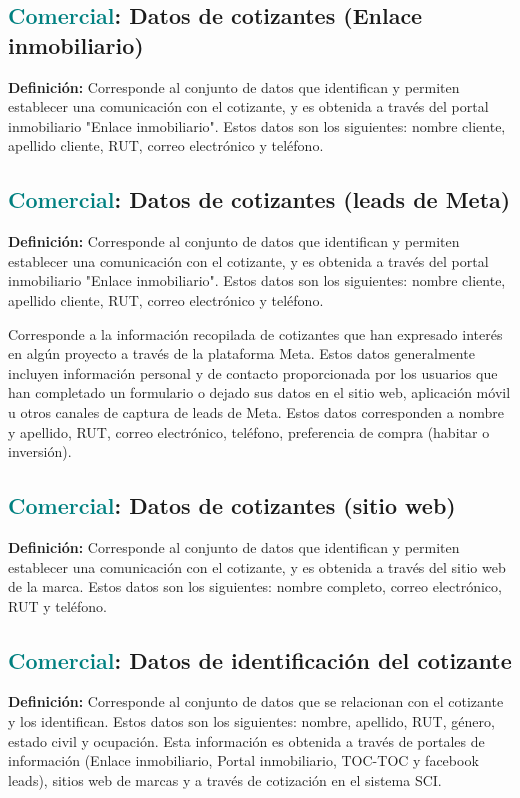 \documentclass[12pt]{article}
\begin{document}
\subsection{\textcolor{teal}{Comercial}: Datos de cotizantes (Enlace inmobiliario)}
\textbf{Definición:} Corresponde al conjunto de datos que identifican y permiten establecer una comunicación con el cotizante, y es obtenida a través del portal inmobiliario "Enlace inmobiliario". Estos datos son los siguientes: nombre cliente, apellido cliente, RUT, correo electrónico y teléfono.
\subsection{\textcolor{teal}{Comercial}: Datos de cotizantes (leads de Meta)}
\textbf{Definición:} Corresponde al conjunto de datos que identifican y permiten establecer una comunicación con el cotizante, y es obtenida a través del portal inmobiliario "Enlace inmobiliario". Estos datos son los siguientes: nombre cliente, apellido cliente, RUT, correo electrónico y teléfono.

Corresponde a la información recopilada de cotizantes que han expresado interés en algún proyecto a través de la plataforma Meta. Estos datos generalmente incluyen información personal y de contacto proporcionada por los usuarios que han completado un formulario o dejado sus datos en el sitio web, aplicación móvil u otros canales de captura de leads de Meta. Estos datos corresponden a nombre y apellido, RUT, correo electrónico, teléfono, preferencia de compra (habitar o inversión).
\subsection{\textcolor{teal}{Comercial}: Datos de cotizantes (sitio web)}
\textbf{Definición:} Corresponde al conjunto de datos que identifican y permiten establecer una comunicación con el cotizante, y es obtenida a través del sitio web de la marca. Estos datos son los siguientes: nombre completo, correo electrónico, RUT y teléfono.
\subsection{\textcolor{teal}{Comercial}: Datos de identificación del cotizante}
\textbf{Definición:} Corresponde al conjunto de datos que se relacionan con el cotizante y los identifican. Estos datos son los siguientes: nombre, apellido, RUT, género, estado civil y ocupación. Esta información es obtenida a través de portales de información (Enlace inmobiliario, Portal inmobiliario, TOC-TOC y facebook leads), sitios web de marcas y a través de cotización en el sistema SCI.
\end{document}
